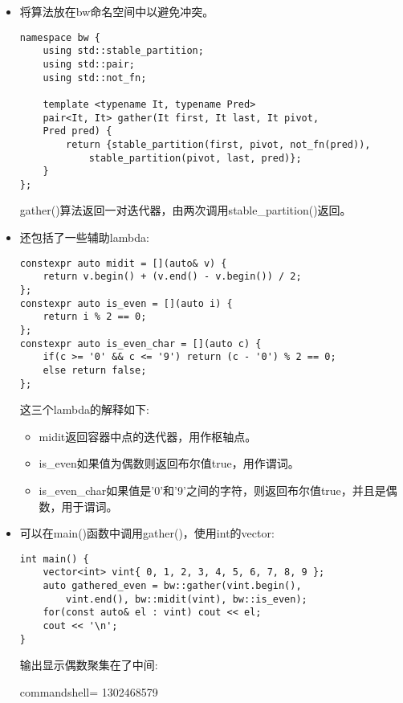 \begin{itemize}
\item 
将算法放在bw命名空间中以避免冲突。

\begin{lstlisting}[style=styleCXX]
namespace bw {
	using std::stable_partition;
	using std::pair;
	using std::not_fn;
	
	template <typename It, typename Pred>
	pair<It, It> gather(It first, It last, It pivot,
	Pred pred) {
		return {stable_partition(first, pivot, not_fn(pred)),
			stable_partition(pivot, last, pred)};
	}
};
\end{lstlisting}

gather()算法返回一对迭代器，由两次调用stable\_partition()返回。

\item 
还包括了一些辅助lambda:

\begin{lstlisting}[style=styleCXX]
constexpr auto midit = [](auto& v) {
	return v.begin() + (v.end() - v.begin()) / 2;
};
constexpr auto is_even = [](auto i) {
	return i % 2 == 0;
};
constexpr auto is_even_char = [](auto c) {
	if(c >= '0' && c <= '9') return (c - '0') % 2 == 0;
	else return false;
};
\end{lstlisting}

这三个lambda的解释如下:

\begin{itemize}
\item 
midit返回容器中点的迭代器，用作枢轴点。

\item 
is\_even如果值为偶数则返回布尔值true，用作谓词。

\item 
is\_even\_char如果值是'0'和'9'之间的字符，则返回布尔值true，并且是偶数，用于谓词。
\end{itemize}

\item 
可以在main()函数中调用gather()，使用int的vector:

\begin{lstlisting}[style=styleCXX]
int main() {
	vector<int> vint{ 0, 1, 2, 3, 4, 5, 6, 7, 8, 9 };
	auto gathered_even = bw::gather(vint.begin(),
		vint.end(), bw::midit(vint), bw::is_even);
	for(const auto& el : vint) cout << el;
	cout << '\n';
}
\end{lstlisting}

输出显示偶数聚集在了中间:

\begin{tcblisting}{commandshell={}}
1302468579
\end{tcblisting}


\end{itemize}
